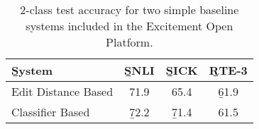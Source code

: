 %

%
%

\begin{table}
\begin{center}
\def\t#1{\small{#1}}
\begin{tabular}{l@{\hskip \colspaceL}c@{\hskip \colspaceL}c@{\hskip \colspaceL}c}
\toprule
\b{System} & \b{SNLI} & \b{SICK} & \b{RTE-3} \\
\midrule
\t{Edit Distance Based}        & \t{71.9} & \t{65.4} & \b{61.9} \\
\t{Classifier Based}           & \b{72.2} & \b{71.4} & \t{61.5} \\
\bottomrule
\end{tabular}
\end{center}
\caption{
\label{tab:eopresults}
2-class test accuracy for two simple baseline systems included in the
  Excitement Open Platform.
}
\end{table}
%
%

